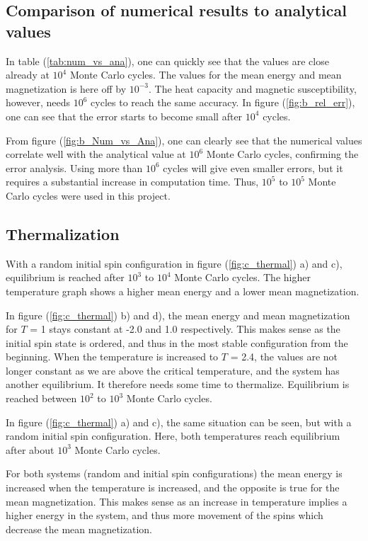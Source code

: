 \documentclass[10pt,a4paper,titlepage]{article}
\begin{document}
\subsection{Comparison of numerical results to analytical values}
In table (\ref{tab:num_vs_ana}), one can quickly see that the values are close already at $10^4$ Monte Carlo cycles. The values for the mean energy and mean magnetization is here off by $10^{-3}$. The heat capacity and magnetic susceptibility, however, needs $10^6$ cycles to reach the same accuracy. In figure (\ref{fig:b_rel_err}), one can see that the error starts to become small after $10^4$ cycles.

From figure (\ref{fig:b_Num_vs_Ana}), one can clearly see that the numerical values correlate well with the analytical value at $10^6$ Monte Carlo cycles, confirming the error analysis. Using more than $10^6$ cycles will give even smaller errors, but it requires a substantial increase in computation time. Thus, $10^5$ to $10^5$ Monte Carlo cycles were used in this project. 


\subsection{Thermalization}
With a random initial spin configuration in figure (\ref{fig:c_thermal}) a) and c), equilibrium is reached after $10^3$ to $10^4$ Monte Carlo cycles. The higher temperature graph shows a higher mean energy and a lower mean magnetization. 

In figure (\ref{fig:c_thermal}) b) and d), the mean energy and mean magnetization for $T$ = 1 stays constant at -2.0 and 1.0 respectively. This makes sense as the initial spin state is ordered, and thus in the most stable configuration from the beginning. When the temperature is increased to $T$ = 2.4, the values are not longer constant as we are above the critical temperature, and the system has another equilibrium. It therefore needs some time to thermalize. Equilibrium is reached between $10^2$ to $10^3$ Monte Carlo cycles. 

In figure (\ref{fig:c_thermal}) a) and c), the same situation can be seen, but with a random initial spin configuration. Here, both temperatures reach equilibrium after about $10^3$ Monte Carlo cycles. 

For both systems (random and initial spin configurations) the mean energy is increased when the temperature is increased, and the opposite is true for the mean magnetization. This makes sense as an increase in temperature implies a higher energy in the system, and thus more movement of the spins which decrease the mean magnetization.
\end{document}
